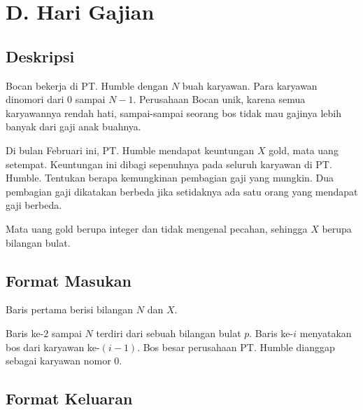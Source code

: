\documentclass{article}
\begin{document}
\section*{\hfil D. Hari Gajian\hfil}


\subsection*{Deskripsi}

\par\noindent Bocan bekerja di PT. Humble dengan $N$ buah karyawan. Para karyawan dinomori dari $0$ sampai $N-1$. Perusahaan Bocan unik, karena semua karyawannya rendah hati, sampai-sampai seorang bos tidak mau gajinya lebih banyak dari gaji anak buahnya.

\par\noindent Di bulan Februari ini, PT. Humble mendapat keuntungan $X$ gold, mata uang setempat. Keuntungan ini dibagi sepenuhnya pada seluruh karyawan di PT. Humble. Tentukan berapa kemungkinan pembagian gaji yang mungkin. Dua pembagian gaji dikatakan berbeda jika setidaknya ada satu orang yang mendapat gaji berbeda.

\par\noindent Mata uang gold berupa integer dan tidak mengenal pecahan, sehingga $X$ berupa bilangan bulat.

\subsection*{Format Masukan}

\par\noindent Baris pertama berisi bilangan $N$ dan $X$.
\par\noindent Baris ke-$2$ sampai $N$ terdiri dari sebuah bilangan bulat $p$. Baris ke-$i$ menyatakan bos dari karyawan ke-$(i-1)$. Bos besar perusahaan PT. Humble dianggap sebagai karyawan nomor $0$.

\subsection*{Format Keluaran}
\end{document}
